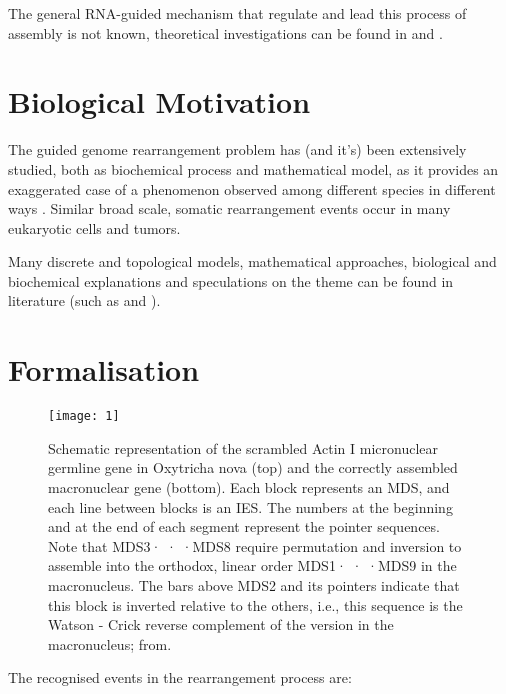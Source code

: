 The general RNA-guided mechanism that regulate and lead this process of assembly is not known, theoretical investigations can be found in \cite{Brijder2007} and \cite{Ehrenfeucht:2004:CLC:971120}.


\section{Biological Motivation}
The guided genome rearrangement problem has (and it's) been extensively \cite{Ehrenfeucht:2004:CLC:971120} studied, both as biochemical process and mathematical model, as it provides an exaggerated case of a phenomenon observed among different species in different ways \cite{ANGELESKA20093020}. Similar broad scale, somatic rearrangement events occur in many eukaryotic cells and tumors.

Many discrete and topological models, mathematical approaches, biological and biochemical explanations and speculations on the theme can be found in literature (such as \cite{prescott2001} \cite{Brijder2014} \cite{ANGELESKA2007706} and \cite{programmedgenome}).

\section{Formalisation}

\begin{figure}[h]
  \centering
    \texttt{[image: 1]}
  \caption{Schematic representation of the scrambled Actin I micronuclear germline gene in Oxytricha nova (top) and the correctly assembled macronuclear gene (bottom). Each block represents an MDS, and each line between blocks is an IES. The numbers at the beginning and at the end of each segment represent the pointer sequences. Note that MDS3· · ·MDS8 require permutation and inversion to assemble into the orthodox, linear order MDS1· · ·MDS9 in the macronucleus. The bars above MDS2 and its pointers indicate that this block is inverted relative to the others, i.e., this sequence is the Watson - Crick reverse complement of the version in the macronucleus; from\cite{prescottgreslin}.}

\end{figure}

The recognised events in the rearrangement process are:

